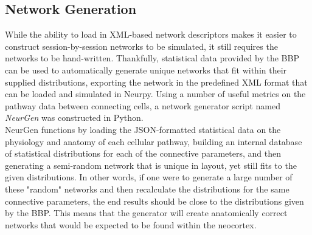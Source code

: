 \documentclass[letterpaper, 10 pt, conference]{ieeeconf}  %
\begin{document}
\subsection*{Network Generation}

While the ability to load in XML-based network descriptors makes it easier to construct session-by-session networks to be simulated, it still requires the networks to be hand-written. Thankfully, statistical data provided by the BBP can be used to automatically generate unique networks that fit within their supplied distributions, exporting the network in the predefined XML format that can be loaded and simulated in Neurpy. Using a number of useful metrics on the pathway data between connecting cells, a network generator script named \emph{NeurGen} was constructed in Python. \\
NeurGen functions by loading the JSON-formatted statistical data on the physiology and anatomy of each cellular pathway, building an internal database of statistical distributions for each of the connective parameters, and then generating a semi-random network that is unique in layout, yet still fits to the given distributions. In other words, if one were to generate a large number of these "random" networks and then recalculate the distributions for the same connective parameters, the end results should be close to the distributions given by the BBP. This means that the generator will create anatomically correct networks that would be expected to be found within the neocortex.\\
\end{document}
